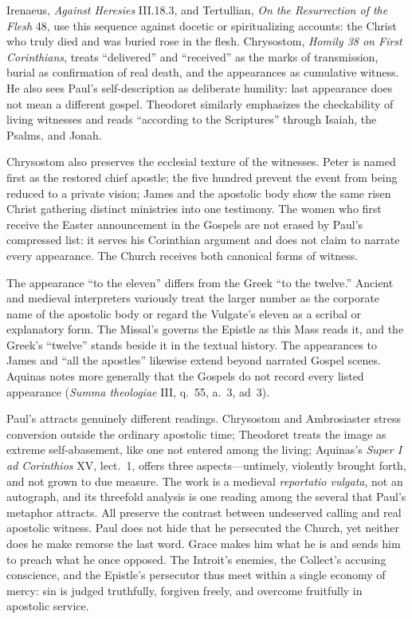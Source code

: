 Irenaeus, \emph{Against Heresies} III.18.3, and Tertullian,
\emph{On the Resurrection of the Flesh} 48, use this sequence against
docetic or spiritualizing accounts: the Christ who truly died and was buried
rose in the flesh. Chrysostom, \emph{Homily 38 on First Corinthians}, treats
``delivered'' and ``received'' as the marks of transmission, burial as
confirmation of real death, and the appearances as cumulative witness. He
also sees Paul's self-description as deliberate humility: last appearance
does not mean a different gospel. Theodoret similarly emphasizes the
checkability of living witnesses and reads ``according to the Scriptures''
through Isaiah, the Psalms, and Jonah.

Chrysostom also preserves the ecclesial texture of the witnesses. Peter is
named first as the restored chief apostle; the five hundred prevent the event
from being reduced to a private vision; James and the apostolic body show the
same risen Christ gathering distinct ministries into one testimony. The women
who first receive the Easter announcement in the Gospels are not erased by
Paul's compressed list: it serves his Corinthian argument and does not claim to
narrate every appearance. The Church receives both canonical forms of witness.

The appearance ``to the eleven'' differs from the Greek ``to the twelve.''
Ancient and medieval interpreters variously treat the larger number as the
corporate name of the apostolic body or regard the Vulgate's eleven as a
scribal or explanatory form. The Missal's  governs the Epistle
as this Mass reads it, and the Greek's ``twelve'' stands beside it in the
textual history. The appearances to James and ``all the apostles'' likewise extend beyond narrated
Gospel scenes. Aquinas notes more generally that the Gospels do not record
every listed appearance (\emph{Summa theologiae} III, q.~55, a.~3, ad~3).

Paul's  attracts genuinely different readings.
Chrysostom and Ambrosiaster stress conversion outside the ordinary apostolic
time; Theodoret treats the image as extreme self-abasement, like one not
entered among the living; Aquinas's \emph{Super I ad Corinthios} XV, lect.~1,
offers three aspects---untimely, violently brought forth, and not grown to due
measure. The work is a medieval \emph{reportatio vulgata}, not an autograph,
and its threefold analysis is one reading among the several that Paul's
metaphor attracts. All preserve the contrast between undeserved
calling and real apostolic witness. Paul does not hide that he persecuted the
Church, yet neither does he make remorse the last word. Grace makes him what he
is and sends him to preach what he once opposed. The Introit's enemies, the
Collect's accusing conscience, and the Epistle's persecutor thus meet within a
single economy of mercy: sin is judged truthfully, forgiven freely, and
overcome fruitfully in apostolic service.

